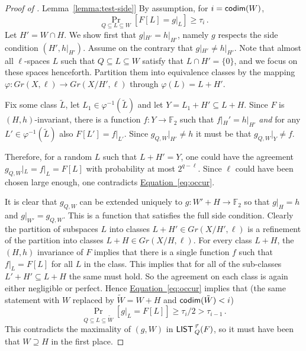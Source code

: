 \documentclass[11pt]{article}
\numberwithin{equation}{section}
\theoremstyle{definition}
\theoremstyle{plain}
\newcommand{\expref}[2]{\hyperref[#2]{#1~\ref{#2}}}
\newcommand{\expeqref}[2]{\hyperref[#2]{#1~\eqref{#2}}}
\newcommand\Prob[2]{{\Pr_{#1}\left[ {#2} \right]}}
\newcommand*\codimm{{\sf codim}}
\renewcommand\ge{\geqslant}
\renewcommand\subset{\subseteq}
\renewcommand\supset{\supseteq}
\def\M{{\sf LIST\,}}
\def\F{\mathbb{F}}
\begin{document}
\begin{proof}[Proof of \expref{Lemma}{lemma:test-side}]
By assumption, for $i = \codimm(W)$,
\begin{equation}\label{eq:occur} \Prob{Q\subset L\subset W}{F[L] = g|_L} \ge \tau_i\,.
\end{equation}
%
Let $H' = W \cap H$. We show first that $g|_{H'} =h|_{H'}$, namely  $g$  respects the side condition $(H',h|_{H'})$. Assume on the contrary that $g|_{H'} \neq h|_{H'}$.
Note that almost all $\ell$-spaces $L$ such that $Q\subseteq L\subseteq W$ satisfy that $L\cap H' = \{0\}$, and
we focus on these spaces henceforth. Partition them %
%
%
%
%
%
into equivalence classes by the mapping  $\varphi:Gr(X,\ell)\to Gr(X/H',\ell)$ through $\varphi(L)= L+H'$.

Fix some class $\tilde L$, let $L_1\in \varphi^{-1}(\tilde L)$ and let $Y = L_1+H' \subset L+H$. Since $F$ is $(H,h)$-invariant, there is a function $f:Y\to\F_2$ such that $f|_H' = h|_{H'}$ {\em and} for any $L' \in \varphi^{-1}(\tilde L)$ also $F[L'] = f|_{L'}$.
%
Since $g_{Q,W}|_{H'} \neq h$ it must be that $g_{Q,W}|_{Y} \neq f$.

Therefore, for a random $L$ such that $L+H'=Y$, one could have the agreement $g_{Q,W}|_L = f|_L= F[L]$ with probability at most $2^{q-\ell}$. Since $\ell$ could have been chosen large enough, one contradicts \expeqref{Equation}{eq:occur}.

It is clear that $g_{Q,W}$ can be extended uniquely to $g:W'+H\to\F_2$ so that $g|_H = h$ and $g|_{W'} = g_{Q,W}$. This is a function that satisfies the full side condition.
Clearly the partition of subspaces $L$ into classes $L+H' \in Gr(X/H',\ell)$ is a refinement of the partition into classes $L+H \in Gr(X/H,\ell)$.
For every class $L+H$, the $(H,h)$ invariance of $F$ implies that there is a single function $f$ such that $f|_L = F[L]$ for all $L$ in the class. This implies that for all of the sub-classes $L'+H' \subset L+H$ the same must hold. So the agreement on each class is again either negligible or perfect.
Hence \expeqref{Equation}{eq:occur} implies that (the same statement with $W$ replaced by $\tilde W=W+H$ and $\codimm(\tilde W) < i$)
\begin{equation} \label{eq:w-tilde}
  \Prob{Q\subset L \subset \tilde W}{{g}|_L = F[L]}\ge  \tau_i/2 > \tau_{i-1}\,.
 \end{equation}
 This contradicts the maximality of $(g,W)$ in $\M_Q^{\vec\tau}(F)$, so it must have been that $W\supset H$ in the first place.
\end{proof}
\end{document}
